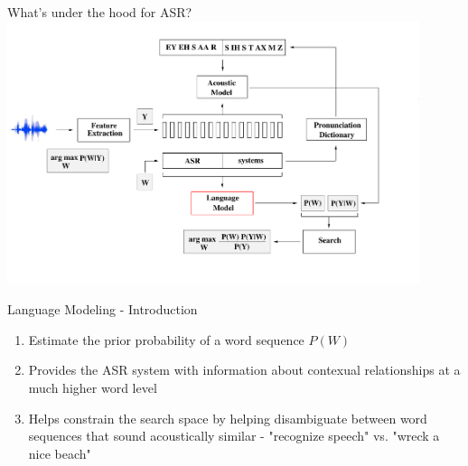 \begin{frame}{What's under the hood for ASR?}
\includegraphics[height=77mm]{figures/b3}
\end{frame}

\begin{frame}{Language Modeling - Introduction}
\begin{enumerate}
\item Estimate the \alert{prior probability} of a word sequence $P(W)$
\item Provides the ASR system with \alert{information about contexual relationships} at a much higher word level
\item Helps \alert{constrain the search space} by helping disambiguate between word sequences that 
sound acoustically similar - "recognize speech" vs. "wreck a nice beach"
\end{enumerate}
\end{frame}


